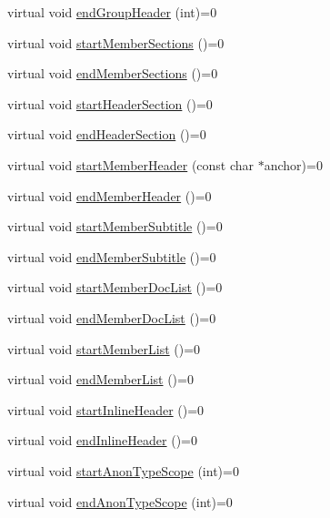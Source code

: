 \begin{DoxyCompactItemize}
\item 
virtual void \hyperlink{class_output_generator_a16003f13c40bcbb34bbe04eb13633637}{end\+Group\+Header} (int)=0
\item 
virtual void \hyperlink{class_output_generator_a3dcfbf917012cf7e133f6876750ca29b}{start\+Member\+Sections} ()=0
\item 
virtual void \hyperlink{class_output_generator_a68c7d0afc95708807a5e623a7e9bb9db}{end\+Member\+Sections} ()=0
\item 
virtual void \hyperlink{class_output_generator_a60a86f83cd8878a315820831c66f7e55}{start\+Header\+Section} ()=0
\item 
virtual void \hyperlink{class_output_generator_a0be4290a396c38e39361a1a23f331730}{end\+Header\+Section} ()=0
\item 
virtual void \hyperlink{class_output_generator_a7af0bd09e06461de70675d9512a2f67e}{start\+Member\+Header} (const char $\ast$anchor)=0
\item 
virtual void \hyperlink{class_output_generator_a59dd3993aedf7baf7465b67d4327335e}{end\+Member\+Header} ()=0
\item 
virtual void \hyperlink{class_output_generator_a6c10a744bfe79da169794579d92c6f38}{start\+Member\+Subtitle} ()=0
\item 
virtual void \hyperlink{class_output_generator_a0c56a25591efb4a9b38da70757dfe46c}{end\+Member\+Subtitle} ()=0
\item 
virtual void \hyperlink{class_output_generator_a79d92b273b6678f0484f507f9aeed930}{start\+Member\+Doc\+List} ()=0
\item 
virtual void \hyperlink{class_output_generator_adac2120718344406921dc07cd60c8ead}{end\+Member\+Doc\+List} ()=0
\item 
virtual void \hyperlink{class_output_generator_a55bfc9535965545c98a07fd5e94ccfde}{start\+Member\+List} ()=0
\item 
virtual void \hyperlink{class_output_generator_af3e875ff86510c53f355c024cc3a574d}{end\+Member\+List} ()=0
\item 
virtual void \hyperlink{class_output_generator_a75c7b7e0e20ce30957ed49fd1d1d246d}{start\+Inline\+Header} ()=0
\item 
virtual void \hyperlink{class_output_generator_a02b0b97eaa17e069eda7cc7f3e794a91}{end\+Inline\+Header} ()=0
\item 
virtual void \hyperlink{class_output_generator_a13587c69b6272779d38b6bc2a45fbfd5}{start\+Anon\+Type\+Scope} (int)=0
\item 
virtual void \hyperlink{class_output_generator_a3cf66346a0594b1987811bc258b598f6}{end\+Anon\+Type\+Scope} (int)=0

\end{DoxyCompactItemize}
